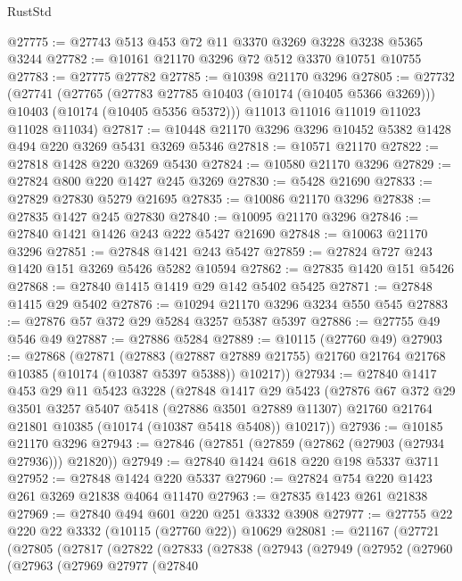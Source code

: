 \begin{lexlean}{RustStd}
\begin{coremodule}
@27775 := @27743 @513 @453 @72 @11 @3370 @3269 @3228 @3238 @5365 @3244
@27782 := @10161 @21170 @3296 @72 @512 @3370 @10751 @10755
@27783 := @27775 @27782
@27785 := @10398 @21170 @3296
@27805 := @27732
    (@27741
      (@27765
        (@27783 @27785 @10403 (@10174 (@10405 @5366 @3269)))
        @10403
        (@10174 (@10405 @5356 @5372)))
      @11013
      @11016
      @11019
      @11023
      @11028
      @11034)
@27817 := @10448 @21170 @3296 @3296 @10452 @5382 @1428 @494 @220 @3269 @5431 @3269 @5346
@27818 := @10571 @21170
@27822 := @27818 @1428 @220 @3269 @5430
@27824 := @10580 @21170 @3296
@27829 := @27824 @800 @220 @1427 @245 @3269
@27830 := @5428 @21690
@27833 := @27829 @27830 @5279 @21695
@27835 := @10086 @21170 @3296
@27838 := @27835 @1427 @245 @27830
@27840 := @10095 @21170 @3296
@27846 := @27840 @1421 @1426 @243 @222 @5427 @21690
@27848 := @10063 @21170 @3296
@27851 := @27848 @1421 @243 @5427
@27859 := @27824 @727 @243 @1420 @151 @3269 @5426 @5282 @10594
@27862 := @27835 @1420 @151 @5426
@27868 := @27840 @1415 @1419 @29 @142 @5402 @5425
@27871 := @27848 @1415 @29 @5402
@27876 := @10294 @21170 @3296 @3234 @550 @545
@27883 := @27876 @57 @372 @29 @5284 @3257 @5387 @5397
@27886 := @27755 @49 @546 @49
@27887 := @27886 @5284
@27889 := @10115 (@27760 @49)
@27903 := @27868
    (@27871
      (@27883
        (@27887 @27889 @21755)
        @21760
        @21764
        @21768
        @10385
        (@10174 (@10387 @5397 @5388))
        @10217))
@27934 := @27840
    @1417
    @453
    @29
    @11
    @5423
    @3228
    (@27848
      @1417
      @29
      @5423
      (@27876
        @67
        @372
        @29
        @3501
        @3257
        @5407
        @5418
        (@27886 @3501 @27889 @11307)
        @21760
        @21764
        @21801
        @10385
        (@10174 (@10387 @5418 @5408))
        @10217))
@27936 := @10185 @21170 @3296
@27943 := @27846 (@27851 (@27859 (@27862 (@27903 (@27934 @27936))) @21820))
@27949 := @27840 @1424 @618 @220 @198 @5337 @3711
@27952 := @27848 @1424 @220 @5337
@27960 := @27824 @754 @220 @1423 @261 @3269 @21838 @4064 @11470
@27963 := @27835 @1423 @261 @21838
@27969 := @27840 @494 @601 @220 @251 @3332 @3908
@27977 := @27755 @22 @220 @22 @3332 (@10115 (@27760 @22)) @10629
@28081 := @21167
    (@27721
      (@27805
        (@27817
          (@27822
            (@27833
              (@27838
                (@27943
                  (@27949
                    (@27952
                      (@27960
                        (@27963
                          (@27969
                            @27977
                            (@27840

\end{coremodule}
\end{lexlean}
